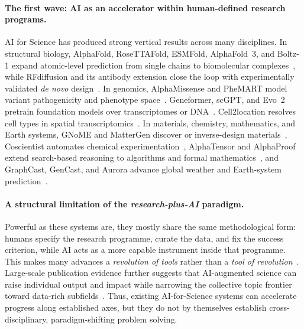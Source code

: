 \documentclass{llmxive}
\begin{document}
\paragraph{The first wave: AI as an accelerator within human-defined research programs.}
AI for Science has produced strong vertical results across many disciplines. In structural biology, AlphaFold, RoseTTAFold, ESMFold, AlphaFold~3, and Boltz-1 expand atomic-level prediction from single chains to biomolecular complexes~\citep{jumper2021highly,baek2021accurate,lin2023evolutionary,abramson2024accurate,wohlwend2025boltz}, while RFdiffusion and its antibody extension close the loop with experimentally validated \emph{de novo} design~\citep{watson2023novo,bennett2026atomically}. In genomics, AlphaMissense and PheMART model variant pathogenicity and phenotype space~\citep{cheng2023accurate,wen2026phenotypic}. Geneformer, scGPT, and Evo~2 pretrain foundation models over transcriptomes or DNA~\citep{theodoris2023transfer,cui2024scgpt,brixi2026genome}. Cell2location resolves cell types in spatial transcriptomics~\citep{kleshchevnikov2022cell2location}. In materials, chemistry, mathematics, and Earth systems, GNoME and MatterGen discover or inverse-design materials~\citep{merchant2023scaling,zeni2025generative}, Coscientist automates chemical experimentation~\citep{boiko2023autonomous}, AlphaTensor and AlphaProof extend search-based reasoning to algorithms and formal mathematics~\citep{fawzi2022discovering,hubert2025olympiad}, and GraphCast, GenCast, and Aurora advance global weather and Earth-system prediction~\citep{lam2023learning,price2025probabilistic,bodnar2025foundation}.

\paragraph{A structural limitation of the \emph{research-plus-AI} paradigm.}
Powerful as these systems are, they mostly share the same methodological form: humans specify the research programme, curate the data, and fix the success criterion, while AI acts as a more capable instrument inside that programme. This makes many advances a \emph{revolution of tools} rather than a \emph{tool of revolution}~\citep{zhou2025advancing}. Large-scale publication evidence further suggests that AI-augmented science can raise individual output and impact while narrowing the collective topic frontier toward data-rich subfields~\citep{hao2026artificial}. Thus, existing AI-for-Science systems can accelerate progress along established axes, but they do not by themselves establish cross-disciplinary, paradigm-shifting problem solving.
\end{document}
